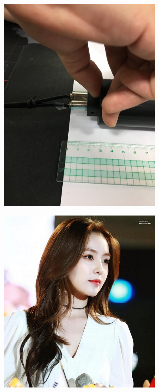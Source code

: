 \documentclass[11pt]{article}
\begin{document}
\begin{center}
\includegraphics[width=0.6\textwidth,angle=45]{img01.jpg}
\end{center}

\begin{center}
\includegraphics[width=0.6\textwidth, page={2}]{RedVelvet}
\end{center}
\end{document}
